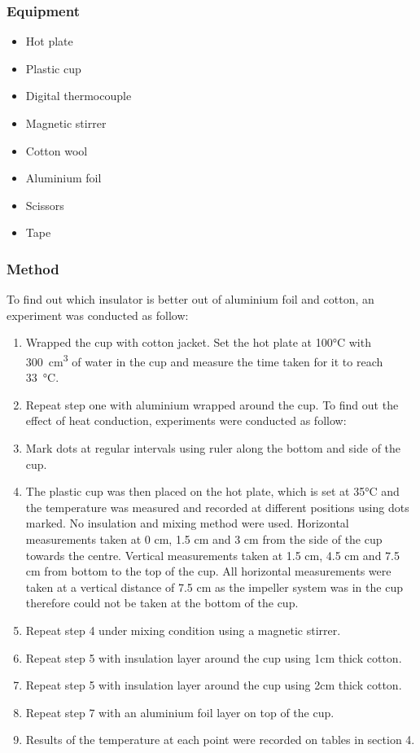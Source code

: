\subsubsection{Equipment}
\begin{itemize}
    \item Hot plate 
    \item Plastic cup  
    \item Digital thermocouple 
    \item Magnetic stirrer  
    \item Cotton wool 
    \item Aluminium foil 
    \item Scissors 
    \item Tape 
\end{itemize}
\subsubsection{Method} \label{sec:Heating-method}
To find out which insulator is better out of aluminium foil and cotton, an experiment was conducted as follow: 
\begin{enumerate}
    \item Wrapped the cup with cotton jacket. Set the hot plate at 100\si{\celsius} with \SI{300}{\cubic\centi\meter} of water in the cup and measure the time taken for it to reach \SI{33}{\celsius}.
    \item Repeat step one with aluminium wrapped around the cup. 
    To find out the effect of heat conduction, experiments were conducted as follow: 
    \item Mark dots at regular intervals using ruler along the bottom and side of the cup.  
    \item The plastic cup was then placed on the hot plate, which is set at 35\si{\celsius} and the temperature was measured and recorded at different positions using dots marked. No insulation and mixing method were used. Horizontal measurements taken at 0 cm, 1.5 cm and 3 cm from the side of the cup towards the centre. Vertical measurements taken at 1.5 cm, 4.5 cm and 7.5 cm from bottom to the top of the cup. All horizontal measurements were taken at a vertical distance of 7.5 cm as the impeller system was in the cup therefore could not be taken at the bottom of the cup. 
    \item Repeat step 4 under mixing condition using a magnetic stirrer. 
    \item Repeat step 5 with insulation layer around the cup using 1cm thick cotton.  
    \item Repeat step 5 with insulation layer around the cup using 2cm thick cotton.   
    \item Repeat step 7 with an aluminium foil layer on top of the cup. 
    \item Results of the temperature at each point were recorded on tables in section 4. 
\end{enumerate}
 

